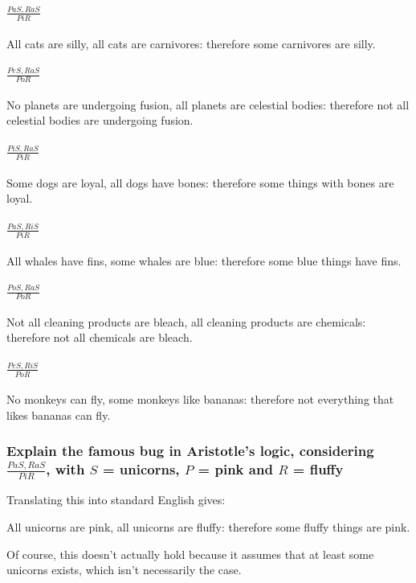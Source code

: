 \documentclass{article}
\begin{document}
\paragraph{$\frac{PaS,RaS}{PiR}$}
All cats are silly, all cats are carnivores:
therefore some carnivores are silly.

\paragraph{$\frac{PeS,RaS}{PoR}$}
No planets are undergoing fusion, all planets are celestial bodies:
therefore not all celestial bodies are undergoing fusion.

\paragraph{$\frac{PiS,RaS}{PiR}$}
Some dogs are loyal, all dogs have bones:
therefore some things with bones are loyal.

\paragraph{$\frac{PaS,RiS}{PiR}$}
All whales have fins, some whales are blue:
therefore some blue things have fins.

\paragraph{$\frac{PoS,RaS}{PoR}$}
Not all cleaning products are bleach, all cleaning products are chemicals:
therefore not all chemicals are bleach.

\paragraph{$\frac{PeS,RiS}{PoR}$}
No monkeys can fly, some monkeys like bananas:
therefore not everything that likes bananas can fly.

\subsubsection{
	Explain the famous bug in Aristotle's logic,
	considering $\frac{PaS,RaS}{PiR}$,
	with $S$ = unicorns, $P$ = pink and $R$ = fluffy
}

Translating this into standard English gives:

All unicorns are pink, all unicorns are fluffy:
therefore some fluffy things are pink.

Of course, this doesn't actually hold because it assumes that at least some
unicorns exists, which isn't necessarily the case.
\end{document}
